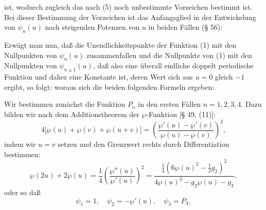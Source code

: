 
ist, wodurch zugleich das nach (5) noch unbestimmte Vorzeichen bestimmt
ist. Bei dieser Bestimmung der Vorzeichen ist das Anfangsglied in der
Entwickelung von $\psi_n(u)$ nach steigenden Potenzen von $u$ in beiden
Fällen (§ 56):

Erwägt man nun, daß die Unendlichkeitspunkte der Funktion (1) mit den
Nullpunkten von $\psi_n(u)$ zusammenfallen und die Nullpunkte von (1) mit
den Nullpunkten von $\psi_{n\pm1}(u)$, daß also
eine überall endliche doppelt periodische Funktion und daher eine
Konstante ist, deren Wert sich aus $u=0$ gleich $-1$ ergibt, so folgt:
woraus sich die beiden folgenden Formeln ergeben:

Wir bestimmen zunächst die Funktion $P_n$ in den ersten Fällen $n=1, 2, 3,
4$. Dazu bilden wir nach dem Additionstheorem der $\wp$-Funktion
[§ 49, (11)]:
\[
4\big[\wp(u) + \wp(v) + \wp(u+v)\big] = \left(\frac{\wp'(u)-\wp'(v)}{\wp(u)-\wp(v)}\right)^2,
\]
indem wir $u=v$ setzen und den Grenzwert rechts durch Differentiation
bestimmen:
\[
\wp(2u) + 2\wp(u) = \frac14\left(\frac{\wp''(u)}{\wp'(u)}\right)^2
= \frac{\frac14\left(6\wp(u)^2 - \frac12 g_2\right)^2}{4\wp(u)^3 - g_2\wp(u) - g_3},
\]
oder
so daß
\[
\psi_1 = 1,\quad \psi_2 = -\wp'(u),\quad \psi_3 = P_3,
\]
